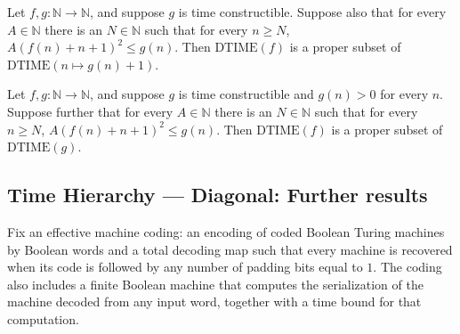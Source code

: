 \begin{theorem}
\label{Complexity.time_hierarchy}
\leanok
{}
Let $f,g:\mathbb{N}\to\mathbb{N}$, and suppose $g$ is time constructible. Suppose also
that for every $A\in\mathbb{N}$ there is an $N\in\mathbb{N}$ such that for every $n\ge
N$, $A(f(n)+n+1)^2\le g(n)$. Then $\mathrm{DTIME}(f)$ is a proper subset of
$\mathrm{DTIME}(n\mapsto g(n)+1)$.
\end{theorem}

\begin{theorem}
\label{Complexity.time_hierarchy_of_pos}
\leanok
{}
Let $f,g:\mathbb{N}\to\mathbb{N}$, and suppose $g$ is time constructible and $g(n)>0$
for every $n$. Suppose further that for every $A\in\mathbb{N}$ there is an
$N\in\mathbb{N}$ such that for every $n\ge N$, $A(f(n)+n+1)^2\le g(n)$. Then
$\mathrm{DTIME}(f)$ is a proper subset of $\mathrm{DTIME}(g)$.
\end{theorem}

\subsection*{Time Hierarchy --- Diagonal: Further results}

\begin{definition}
\label{Complexity.TimeHierarchy.code}
\leanok
{}
Fix an effective machine coding: an encoding of coded Boolean Turing machines by Boolean
words and a total decoding map such that every machine is recovered when its code is
followed by any number of padding bits equal to $1$. The coding also includes a finite
Boolean machine that computes the serialization of the machine decoded from any input
word, together with a time bound for that computation.
\end{definition}

